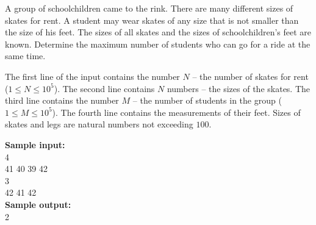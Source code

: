 \documentclass[a4paper]{article}
\begin{document}
A group of schoolchildren came to the rink. There are many different sizes of skates for rent. A student may wear skates of any size that is not smaller than the size of his feet. The sizes of all skates and the sizes of schoolchildren's feet are known. Determine the maximum number of students who can go for a ride at the same time.

The first line of the input contains the number $N$ -- the number of skates for rent ($1 \le N \le 10^5$). The second line contains $N$ numbers -- the sizes of the skates. The third line contains the number $M$ -- the number of students in the group ($1 \le M \le 10^5$). The fourth line contains the measurements of their feet. Sizes of skates and legs are natural numbers not exceeding $100$.

\LINE

\noindent \textbf{Sample input:}\\
4\\
41 40 39 42\\
3\\
42 41 42\\


\noindent \textbf{Sample output:}\\
2
\end{document}
